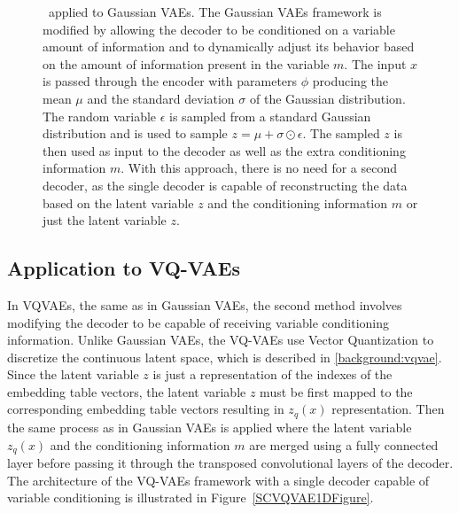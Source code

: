 \begin{figure}[H]
    \centering
    
    \caption[ applied to Gaussian VAEs.]%
    {
        \methodTwo\ applied to Gaussian VAEs. The Gaussian VAEs framework is modified by allowing the decoder to be conditioned on a variable amount of information and to dynamically adjust its behavior based on the amount of information present in the variable $m$. The input $x$ is passed through the encoder with parameters $\phi$ producing the mean $\mu$ and the standard deviation $\sigma$ of the Gaussian distribution. The random variable $\epsilon$ is sampled from a standard Gaussian distribution and is used to sample $ z = \mu + \sigma \odot \epsilon$. The sampled $z$ is then used as input to the decoder as well as the extra conditioning information $m$. With this approach, there is no need for a second decoder, as the single decoder is capable of reconstructing the data based on the latent variable $z$ and the conditioning information $m$ or just the latent variable $z$.
    }\label{SCVAE1DFigure}
\end{figure}

\subsection{Application to VQ-VAEs}

In VQVAEs, the same as in Gaussian VAEs, the second method involves modifying the
decoder to be capable of receiving variable conditioning information. Unlike
Gaussian VAEs, the VQ-VAEs use Vector Quantization to discretize the continuous 
latent space, which is described in \autoref{background:vqvae}. Since the latent
variable $z$ is just a representation of the indexes of the embedding table vectors, the latent variable $z$ must be first mapped to the corresponding embedding table vectors resulting in $z_q(x)$ representation. Then the same process as in Gaussian VAEs is applied where the latent variable $z_q(x)$ and the conditioning information $m$ are merged using a fully connected layer before passing it through the transposed convolutional layers of the decoder. The architecture of the VQ-VAEs framework with a single decoder capable of
variable conditioning is illustrated in Figure~\ref{SCVQVAE1DFigure}.

